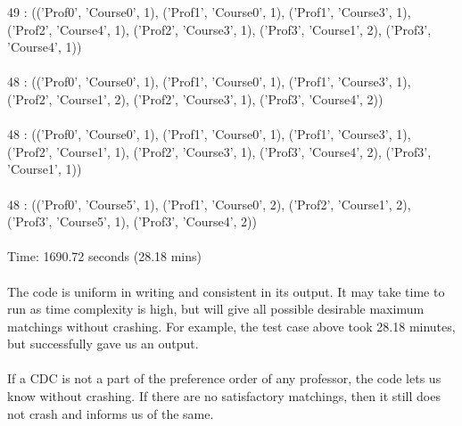 \begin{enumerate}
49 : (('Prof0', 'Course0', 1), ('Prof1', 'Course0', 1), ('Prof1', 'Course3', 1), ('Prof2', 'Course4', 1), ('Prof2', 'Course3', 1), ('Prof3', 'Course1', 2), ('Prof3', 'Course4', 1))\\ \\
48 : (('Prof0', 'Course0', 1), ('Prof1', 'Course0', 1), ('Prof1', 'Course3', 1), ('Prof2', 'Course1', 2), ('Prof2', 'Course3', 1), ('Prof3', 'Course4', 2))\\ \\
48 : (('Prof0', 'Course0', 1), ('Prof1', 'Course0', 1), ('Prof1', 'Course3', 1), ('Prof2', 'Course1', 1), ('Prof2', 'Course3', 1), ('Prof3', 'Course4', 2), ('Prof3', 'Course1', 1))\\ \\
48 : (('Prof0', 'Course5', 1), ('Prof1', 'Course0', 2), ('Prof2', 'Course1', 2), ('Prof3', 'Course5', 1), ('Prof3', 'Course4', 2))\\ \\
Time: 1690.72 seconds (28.18 mins)

\paragraph{} The code is uniform in writing and consistent in its output. It may take time to run as time complexity is high, but will give all possible desirable maximum matchings without crashing. For example, the test case above took 28.18 minutes, but successfully gave us an output.
\paragraph{} If a CDC is not a part of the preference order of any professor, the code lets us know without crashing. If there are no satisfactory matchings, then it still does not crash and informs us of the same.

\end{enumerate}
